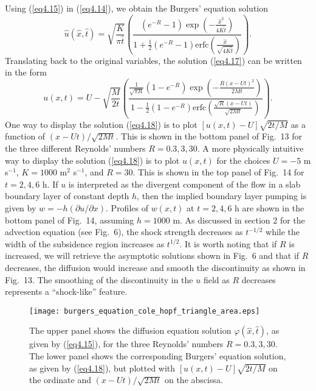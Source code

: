 \documentclass[10pt]{article}
\begin{document}
     Using (\ref{eq4.15}) in (\ref{eq4.14}), we obtain the Burgers' equation
solution
\begin{equation}                                 %
   \hat{u}(\hat{x},\hat{t}) = \sqrt{\frac{K}{\pi \hat{t}}}
            \left(\frac{\left(e^{-R} - 1\right)\exp\left(-\frac{\hat{x}^2}{4K\hat{t}}\right)}
                {1+\tfrac{1}{2}\left(e^{-R} - 1\right)
            \text{erfc}\left(\frac{\hat{x}}{\sqrt{4K\hat{t}}}\right)}\right).
\label{eq4.17}
\end{equation}
Translating back to the original variables, the solution (\ref{eq4.17}) can be
written in the form
\begin{equation}                                 %
   u(x,t) = U - \sqrt{\frac{M}{2t}}
            \left(\frac{\frac{1}{\sqrt{\pi R}}
	      \left(1-e^{-R}\right)\exp\left(-\frac{R(x-Ut)^2}{2Mt}\right)}
             {1-\tfrac{1}{2}\left(1-e^{-R}\right)
             \text{erfc}\left(\frac{\sqrt{R}(x-Ut)}{\sqrt{2Mt}}\right)}\right).
\label{eq4.18}
\end{equation}
One way to display the solution (\ref{eq4.18}) is to plot $[u(x,t)-U]\sqrt{2t/M}$
as a function of $(x-Ut)/\sqrt{2Mt}$. This is shown in the bottom panel of Fig.~13
for the three different Reynolds' numbers $R=0.3,3,30$. A more physically intuitive
way to display the
solution (\ref{eq4.18}) is to plot $u(x,t)$ for the choices $U=-5$ m s$^{-1}$,
$K=1000$ m$^2$ s$^{-1}$, and $R=30$. This is shown in the top panel of Fig.~14
for $t=2,4,6$ h.
If $u$ is interpreted as the divergent component of the flow in
a slab boundary layer of constant depth $h$, then the implied boundary layer pumping
is given by $w = -h(\partial u/\partial x)$. Profiles of $w(x,t)$ at $t=2,4,6$ h
are shown in the bottom panel of Fig.~14, assuming $h=1000$ m. As discussed in section 2
for the advection equation (see Fig.~6), the shock strength decreases as $t^{-1/2}$
while the width of the subsidence region increases as $t^{1/2}$.
It is worth noting that if $R$ is increased, we will retrieve the asymptotic solutions
shown in Fig.~6 and that if $R$ decreases, the diffusion would increase and smooth
the discontinuity as shown in Fig.~13. The smoothing of the discontinuity in the
$u$ field as $R$ decreases represents a ``shock-like'' feature.


\begin{figure}[!t]             %
\centerline{\texttt{[image: burgers\_equation\_cole\_hopf\_triangle\_area.eps]}}
\caption{The upper panel shows the diffusion equation solution $\varphi(\hat{x},\hat{t})$,
as given by (\ref{eq4.15}), for the three Reynolds' numbers $R=0.3,3,30$.
The lower panel shows the corresponding Burgers' equation solution, as given by
(\ref{eq4.18}), but plotted with $[u(x,t)-U]\sqrt{2t/M}$ on the ordinate and
$(x-Ut)/\sqrt{2Mt}$ on the abscissa.}
\end{figure}
\end{document}
